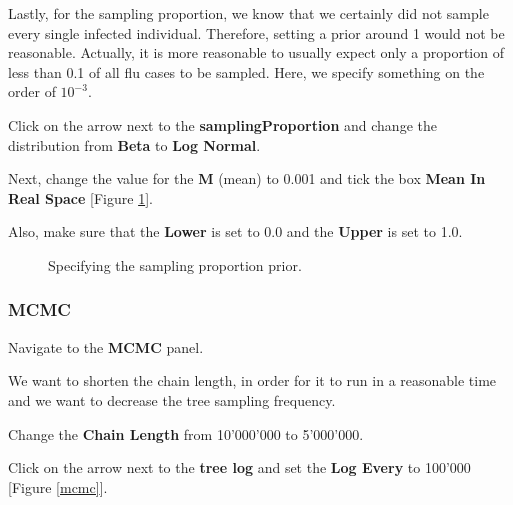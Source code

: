 \documentclass[11pt]{article}
\begin{document}
Lastly, for the sampling proportion, we know that we certainly did not sample every single infected individual. Therefore, setting a prior around 1 would not be reasonable. Actually, it is more reasonable to usually expect only a proportion of less than 0.1 of all flu cases to be sampled. Here, we specify something on the order of $10^{-3}$.

\begin{framed}
Click on the arrow next to the \textbf{samplingProportion} and change the distribution from \textbf{Beta} to \textbf{Log Normal}. 

Next, change the value for the \textbf{M} (mean) to 0.001 and tick the box \textbf{Mean In Real Space} [Figure \ref{samplingProportionPrior}].

Also, make sure that the \textbf{Lower} is set to 0.0 and the \textbf{Upper} is set to 1.0.
\end{framed}

\begin{figure}[h!]
\centering
{}
\caption{\small Specifying the sampling proportion prior.}
\label{samplingProportionPrior}
\end{figure}



\bigskip
\subsubsection{MCMC}

\begin{framed}
Navigate to the \textbf{MCMC} panel.
\end{framed}

We want to shorten the chain length, in order for it to run in a reasonable time and we want to decrease the tree sampling frequency.

\begin{framed}
Change the \textbf{Chain Length} from 10'000'000 to 5'000'000.

Click on the arrow next to the \textbf{tree log} and set the \textbf{Log Every} to 100'000 [Figure \ref{mcmc}].
\end{framed}
\end{document}
